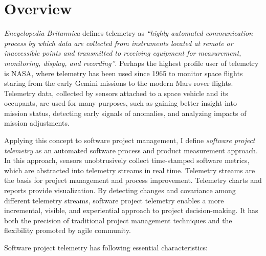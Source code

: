 
\section{Overview} 
\label{Telemetry:Overview}


\textit{Encyclopedia Britannica} defines telemetry as \textit{``highly automated communication process by which data are collected from instruments located at remote or inaccessible points and transmitted to receiving equipment for measurement, monitoring, display, and recording''}. Perhaps the highest profile user of telemetry is NASA, where telemetry has been used since 1965 to monitor space flights staring from the early Gemini missions to the modern Mars rover flights. Telemetry data, collected by sensors attached to a space vehicle and its occupants, are used for many purposes, such as gaining better insight into mission status, detecting early signals of anomalies, and analyzing impacts of mission adjustments.

Applying this concept to software project management, I define \textit{software project telemetry} as an automated software process and product measurement approach. In this approach, sensors unobtrusively collect time-stamped software metrics, which are abstracted into telemetry streams in real time. Telemetry streams are the basis for project management and process improvement. Telemetry charts and reports provide visualization. By detecting changes and covariance among different telemetry streams, software project telemetry enables a more incremental, visible, and experiential approach to project decision-making. It has both the precision of traditional project management techniques and the flexibility promoted by agile community.

Software project telemetry has following essential characteristics:

